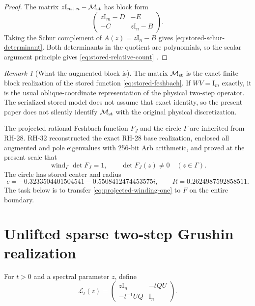 \documentclass[11pt]{article}
\theoremstyle{definition}
\theoremstyle{remark}
\newtheorem{remark}[theorem]{Remark}
\newcommand{\Id}{\mathrm I}
\newcommand{\wind}{\operatorname{wind}}
\newcommand{\Lmat}{\mathcal L}
\newcommand{\Maug}{\mathcal M_{\rm st}}
\begin{document}
\begin{proof}
The matrix $z\Id_{m+n}-\Maug$ has block form
\[
 \begin{pmatrix}
  z\Id_m-D&-E\\ -C&z\Id_n-B
 \end{pmatrix}.
\]
Taking the Schur complement of $A(z)=z\Id_n-B$ gives
\cref{eq:stored-schur-determinant}.  Both determinants in the quotient are
polynomials, so the scalar argument principle gives
\cref{eq:stored-relative-count}
\citep{Ahlfors1979,HornJohnson2013}.
\end{proof}

\begin{remark}[What the augmented block is]
\label{rem:augmented-scope}
The matrix $\Maug$ is the exact finite block realization of the stored
function \cref{eq:stored-feshbach}.  If $WV=\Id_m$ exactly, it is the usual
oblique-coordinate representation of the physical two-step operator.  The
serialized stored model does not assume that exact identity, so the present
paper does not silently identify $\Maug$ with the original physical
discretization.
\end{remark}

The projected rational Feshbach function $F_J$ and the circle $\Gamma$ are
inherited from RH-28.  RH-32 reconstructed the exact RH-28 base realization,
enclosed all augmented and pole eigenvalues with 256-bit Arb arithmetic, and
proved at the present scale that
\begin{equation}
 \wind_\Gamma\det F_J=1,\qquad
 \det F_J(z)\ne0\quad(z\in\Gamma).
 \label{eq:projected-winding-one}
\end{equation}
The circle has stored center and radius
\begin{equation}
 c=-0.3233504401504541-0.5508412474453575i,\qquad
 R=0.2624987592858511.
 \label{eq:stored-circle}
\end{equation}
The task below is to transfer \cref{eq:projected-winding-one} to $F$ on the
entire boundary.

\section{Unlifted sparse two-step Grushin realization}
\label{sec:grushin}

For $t>0$ and a spectral parameter $z$, define
\begin{equation}
 \Lmat_t(z)=
 \begin{pmatrix}
  z\Id_n&-tQU\\
  -t^{-1}UQ&\Id_n
 \end{pmatrix}.
 \label{eq:two-step-linearization}
\end{equation}
\end{document}
